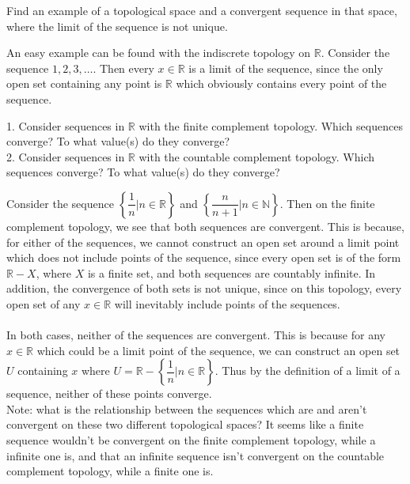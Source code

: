 \documentclass[letterpaper,12pt,twoside]{maths}
\begin{document}
\begin{exercise}[Exercise 3.32]
    Find an example of a topological space and a convergent sequence in
    that space, where the limit of the sequence is not unique.
\end{exercise}

\begin{solution}
An easy example can be found with the indiscrete topology on
$\mathbb{R}$. Consider the sequence $1, 2, 3, \dots$. Then every $x
\in \mathbb{R}$ is a limit of the sequence, since the only open set
containing any point is $\mathbb{R}$ which obviously contains every
point of the sequence. 
\end{solution}

\begin{exercise}[Exercise 3.33]
    1. Consider sequences in $\mathbb{R}$ with the finite complement
    topology. Which sequences converge? To what value(s) do they
    converge?\\
    2. Consider sequences in $\mathbb{R}$ with the countable complement
    topology. Which sequences converge? To what value(s) do they
    converge?
\end{exercise}

\begin{solution}
Consider the sequence $\left\{\dfrac{1}{n} | n \in \mathbb{R}\right\}$ and
$\left\{\dfrac{n}{n+1} | n \in \mathbb{N}\right\}.$ Then on the finite complement
topology, we see that both sequences are convergent. This is because,
for either of the sequences, we cannot construct an open set around a
limit point which does not include points of the sequence, since every
open set is of the form $\mathbb{R} - X$, where $X$ is a finite set,
and both sequences are countably infinite. In addition, the
convergence of both sets is not unique, since on this topology, every
open set of any $x \in \mathbb{R}$ will inevitably include points of
the sequences. \\
\\
In both cases, neither of the sequences are convergent. This is
because for any $x \in \mathbb{R}$ which could be a limit point of the
sequence, we can construct an open set $U$ containing $x$ where $U =
\mathbb{R} - \left\{\dfrac{1}{n} | n \in \mathbb{R}\right\}$. Thus by the
definition of a limit of a sequence, neither of these points converge.
\\
Note: what is the relationship between the sequences which are and
aren't convergent on these two different topological spaces? It seems
like a finite sequence wouldn't be convergent on the finite complement
topology, while a infinite one is, and that an infinite sequence isn't
convergent on the countable complement topology, while a finite one
is. 

\end{solution}
\end{document}
